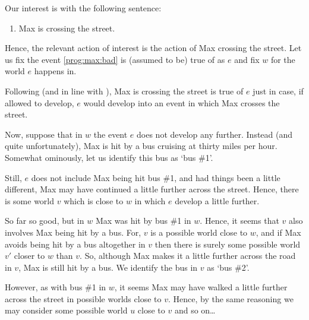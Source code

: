 \begin{note}
  Our interest is with the following sentence:
  \begin{enumerate}
  \item
    \label{prog:max:bad}
    Max is crossing the street.
  \end{enumerate}

  Hence, the relevant action of interest is the action of Max crossing the street.
  Let us fix the event \ref{prog:max:bad} is (assumed to be) true of as \(e\) and fix \(w\) for the world \(e\) happens in.

  Following \citeauthor{Landman:1992wh} (and in line with \assuPP{}), Max is crossing the street is true of \(e\) just in case, if allowed to develop, \(e\) would develop into an event in which Max crosses the street.

  Now, suppose that in \(w\) the event \(e\) does not develop any further.
  Instead (and quite unfortunately), Max is hit by a bus cruising at thirty miles per hour.
  Somewhat ominously, let us identify this bus as `bus \#1'.

  Still, \(e\) does not include Max being hit bus \#1, and had things been a little different, Max may have continued a little further across the street.
  Hence, there is some world \(v\) which is close to \(w\) in which \(e\) develop a little further.

  So far so good, but in \(w\) Max was hit by bus \#1 in \(w\).
  Hence, it seems that \(v\) also involves Max being hit by a bus.
  For, \(v\) is a possible world close to \(w\), and if Max avoids being hit by a bus altogether in \(v\) then there is surely some possible world \(v'\) closer to \(w\) than \(v\).
  So, although Max makes it a little further across the road in \(v\), Max is still hit by a bus.
  We identify the bus in \(v\) as `bus \#2'.

  However, as with bus \#1 in \(w\), it seems Max may have walked a little further across the street in possible worlds close to \(v\).
  Hence, by the same reasoning we may consider some possible world \(u\) close to \(v\) and so on\dots


\end{note}
